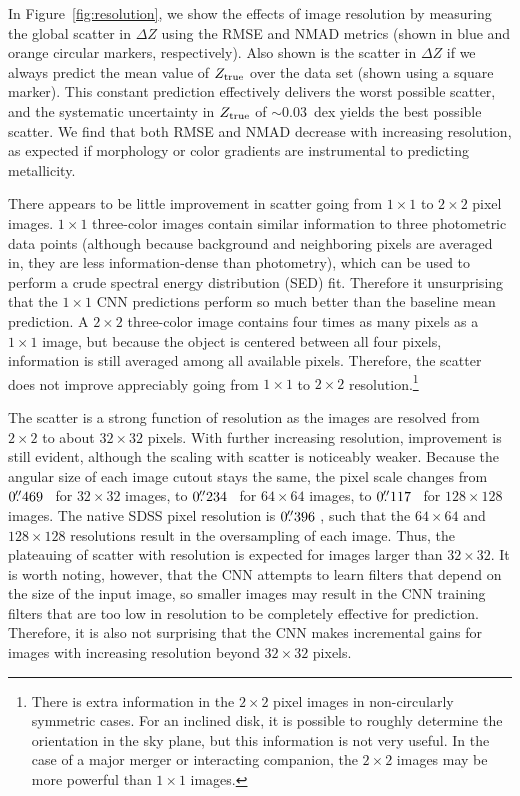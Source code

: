 \documentclass[fleqn,usenatbib]{mnras}
\begin{document}
In Figure~\ref{fig:resolution}, we show the effects of image resolution by measuring the global scatter in $\Delta Z$ using the RMSE and NMAD metrics (shown in blue and orange circular markers, respectively). Also shown is the scatter in $\Delta Z$ if we always predict the mean value of $Z_{\rm true}$ over the data set (shown using a square marker). This constant prediction effectively delivers the worst possible scatter, and the \cite{Tremonti2004} systematic uncertainty in $Z_{\rm true}$ of $\sim 0.03$~dex yields the best possible scatter. We find that both RMSE and NMAD decrease with increasing resolution, as expected if morphology or color gradients are instrumental to predicting metallicity.

There appears to be little improvement in scatter going from $1 \times 1$ to $2\times 2$ pixel images. $1\times 1$ three-color images contain similar information to three photometric data points (although because background and neighboring pixels are averaged in, they are less information-dense than photometry), which can be used to perform a crude spectral energy distribution (SED) fit. Therefore it unsurprising that the $1 \times 1$ CNN predictions perform so much better than the baseline mean prediction. A $2 \times 2$ three-color image contains four times as many pixels as a $1\times 1$ image, but because the object is centered between all four pixels, information is still averaged among all available pixels. Therefore, the scatter does not improve appreciably going from $1 \times 1$ to $2 \times 2$ resolution.\footnote{There is extra information in the $2\times 2$ pixel images in non-circularly symmetric cases. For an inclined disk, it is possible to roughly determine the orientation in the sky plane, but this information is not very useful. In the case of a major merger or interacting companion, the $2\times 2$ images may be more powerful than $1 \times 1$ images.}

The scatter is a strong function of resolution as the images are resolved from $2 \times 2$ to about $32 \times 32$ pixels. With further increasing resolution, improvement is still evident, although the scaling with scatter is noticeably weaker. Because the angular size of each image cutout stays the same, the pixel scale changes from $0\hbox{$.\!\!^{\prime\prime}$}469$ \perpixel\ for $32 \times 32$ images, to $0\hbox{$.\!\!^{\prime\prime}$}234$ \perpixel\ for $64 \times 64$ images, to $0\hbox{$.\!\!^{\prime\prime}$}117$ \perpixel\ for $128 \times 128$ images. The native SDSS pixel resolution is $0\hbox{$.\!\!^{\prime\prime}$}396$ \perpixel, such that the $64 \times 64$ and $128 \times 128$ resolutions result in the oversampling of each image. Thus, the plateauing of scatter with resolution is expected for images larger than $32 \times 32$. It is worth noting, however, that the CNN attempts to learn filters that depend on the size of the input image, so smaller images may result in the CNN training filters that are too low in resolution to be completely effective for prediction. Therefore, it is also not surprising that the CNN makes incremental gains for images with increasing resolution beyond $32 \times 32$ pixels.
\end{document}
